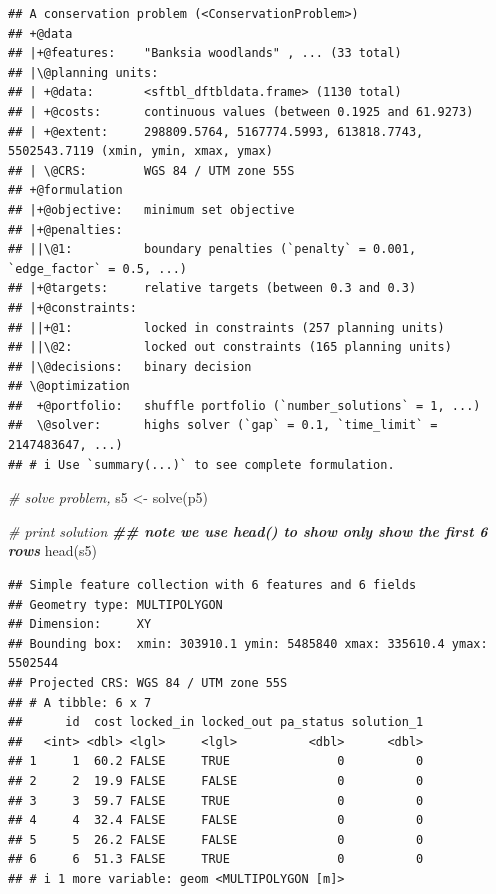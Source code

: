 \documentclass[
  12pt,
]{book}
\newenvironment{Shaded}{\begin{snugshade}}{\end{snugshade}}
\newcommand{\CommentTok}[1]{\textcolor[rgb]{0.56,0.35,0.01}{\textit{#1}}}
\newcommand{\DocumentationTok}[1]{\textcolor[rgb]{0.56,0.35,0.01}{\textbf{\textit{#1}}}}
\newcommand{\FunctionTok}[1]{\textcolor[rgb]{0.00,0.00,0.00}{#1}}
\newcommand{\NormalTok}[1]{#1}
\newcommand{\OtherTok}[1]{\textcolor[rgb]{0.56,0.35,0.01}{#1}}
\begin{document}
\begin{verbatim}
## A conservation problem (<ConservationProblem>)
## +@data
## |+@features:    "Banksia woodlands" , ... (33 total)
## |\@planning units:
## | +@data:       <sftbl_dftbldata.frame> (1130 total)
## | +@costs:      continuous values (between 0.1925 and 61.9273)
## | +@extent:     298809.5764, 5167774.5993, 613818.7743, 5502543.7119 (xmin, ymin, xmax, ymax)
## | \@CRS:        WGS 84 / UTM zone 55S
## +@formulation
## |+@objective:   minimum set objective
## |+@penalties:
## ||\@1:          boundary penalties (`penalty` = 0.001, `edge_factor` = 0.5, ...)
## |+@targets:     relative targets (between 0.3 and 0.3)
## |+@constraints:
## ||+@1:          locked in constraints (257 planning units)
## ||\@2:          locked out constraints (165 planning units)
## |\@decisions:   binary decision
## \@optimization
##  +@portfolio:   shuffle portfolio (`number_solutions` = 1, ...)
##  \@solver:      highs solver (`gap` = 0.1, `time_limit` = 2147483647, ...)
## # i Use `summary(...)` to see complete formulation.
\end{verbatim}

\begin{Shaded}
\begin{Highlighting}[]
\CommentTok{\# solve problem,}
\NormalTok{s5 }\OtherTok{\textless{}{-}} \FunctionTok{solve}\NormalTok{(p5)}

\CommentTok{\# print solution}
\DocumentationTok{\#\# note we use head() to show only show the first 6 rows}
\FunctionTok{head}\NormalTok{(s5)}
\end{Highlighting}
\end{Shaded}

\begin{verbatim}
## Simple feature collection with 6 features and 6 fields
## Geometry type: MULTIPOLYGON
## Dimension:     XY
## Bounding box:  xmin: 303910.1 ymin: 5485840 xmax: 335610.4 ymax: 5502544
## Projected CRS: WGS 84 / UTM zone 55S
## # A tibble: 6 x 7
##      id  cost locked_in locked_out pa_status solution_1
##   <int> <dbl> <lgl>     <lgl>          <dbl>      <dbl>
## 1     1  60.2 FALSE     TRUE               0          0
## 2     2  19.9 FALSE     FALSE              0          0
## 3     3  59.7 FALSE     TRUE               0          0
## 4     4  32.4 FALSE     FALSE              0          0
## 5     5  26.2 FALSE     FALSE              0          0
## 6     6  51.3 FALSE     TRUE               0          0
## # i 1 more variable: geom <MULTIPOLYGON [m]>
\end{verbatim}
\end{document}
